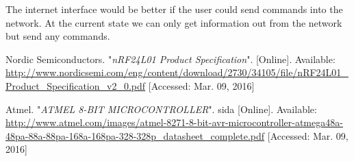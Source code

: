 \documentclass[a4paper,11pt]{article}
\begin{document}
The internet interface would be better if the user could send commands
into the network. At the current state we can only get information out
from the network but send any commands.

\begin{thebibliography}{2}

  Nordic Semiconductors. "\emph{nRF24L01 Product Specification}". [Online]. Available: \url{http://www.nordicsemi.com/eng/content/download/2730/34105/file/nRF24L01_Product_Specification_v2_0.pdf} [Accessed: Mar. 09, 2016]

  Atmel. "\emph{ATMEL 8-BIT MICROCONTROLLER}". sida [Online]. Available: \url{http://www.atmel.com/images/atmel-8271-8-bit-avr-microcontroller-atmega48a-48pa-88a-88pa-168a-168pa-328-328p_datasheet_complete.pdf} [Accessed: Mar. 09, 2016]


\end{thebibliography}
\end{document}
